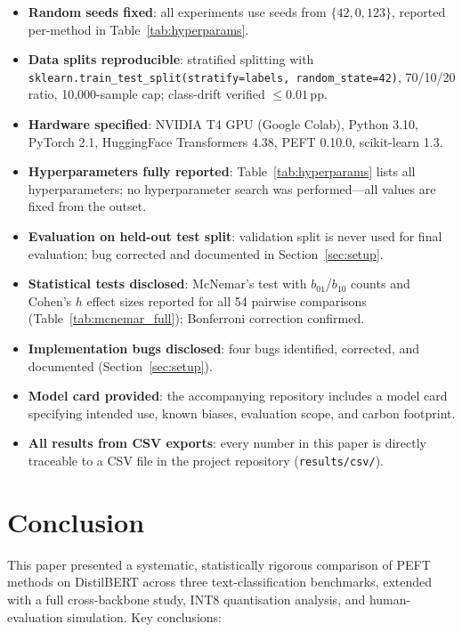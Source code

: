 \documentclass[conference]{IEEEtran}
\begin{document}
\begin{itemize}
  \item[$\checkmark$] \textbf{Random seeds fixed}: all experiments use seeds from $\{42, 0, 123\}$, reported per-method in Table~\ref{tab:hyperparams}.
  \item[$\checkmark$] \textbf{Data splits reproducible}: stratified splitting with \texttt{sklearn.train\_test\_split(stratify=labels, random\_state=42)}, 70/10/20 ratio, 10{,}000-sample cap; class-drift verified ${\leq}0.01$\,pp.
  \item[$\checkmark$] \textbf{Hardware specified}: NVIDIA T4 GPU (Google Colab), Python 3.10, PyTorch 2.1, HuggingFace Transformers 4.38, PEFT 0.10.0, scikit-learn 1.3.
  \item[$\checkmark$] \textbf{Hyperparameters fully reported}: Table~\ref{tab:hyperparams} lists all hyperparameters; no hyperparameter search was performed---all values are fixed from the outset.
  \item[$\checkmark$] \textbf{Evaluation on held-out test split}: validation split is never used for final evaluation; bug corrected and documented in Section~\ref{sec:setup}.
  \item[$\checkmark$] \textbf{Statistical tests disclosed}: McNemar's test with $b_{01}$/$b_{10}$ counts and Cohen's $h$ effect sizes reported for all 54 pairwise comparisons (Table~\ref{tab:mcnemar_full}); Bonferroni correction confirmed.
  \item[$\checkmark$] \textbf{Implementation bugs disclosed}: four bugs identified, corrected, and documented (Section~\ref{sec:setup}).
  \item[$\checkmark$] \textbf{Model card provided}: the accompanying repository includes a model card specifying intended use, known biases, evaluation scope, and carbon footprint.
  \item[$\checkmark$] \textbf{All results from CSV exports}: every number in this paper is directly traceable to a CSV file in the project repository (\texttt{results/csv/}).
\end{itemize}

\section{Conclusion}
\label{sec:conclusion}

This paper presented a systematic, statistically rigorous comparison of PEFT methods on DistilBERT across three text-classification benchmarks, extended with a full cross-backbone study, INT8 quantisation analysis, and human-evaluation simulation. Key conclusions:
\end{document}
